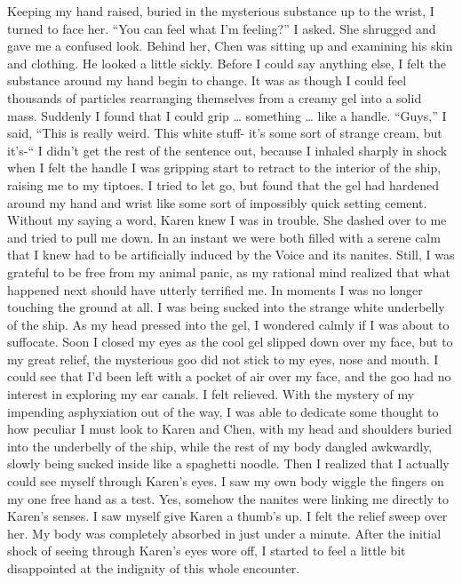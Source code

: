\documentclass[a4paper]{article}
\begin{document}
Keeping my hand raised, buried in the mysterious substance up to the wrist, I turned to face her. “You can feel what I’m feeling?” I asked.
She shrugged and gave me a confused look. Behind her, Chen was sitting up and examining his skin and clothing. He looked a little sickly.
Before I could say anything else, I felt the substance around my hand begin to change. It was as though I could feel thousands of particles rearranging themselves from a creamy gel into a solid mass. Suddenly I found that I could grip … something … like a handle.
“Guys,” I said, “This is really weird. This white stuff- it’s some sort of strange cream, but it’s-“
I didn’t get the rest of the sentence out, because I inhaled sharply in shock when I felt the handle I was gripping start to retract to the interior of the ship, raising me to my tiptoes. I tried to let go, but found that the gel had hardened around my hand and wrist like some sort of impossibly quick setting cement.
Without my saying a word, Karen knew I was in trouble. She dashed over to me and tried to pull me down.
In an instant we were both filled with a serene calm that I knew had to be artificially induced by the Voice and its nanites. Still, I was grateful to be free from my animal panic, as my rational mind realized that what happened next should have utterly terrified me.
In moments I was no longer touching the ground at all. I was being sucked into the strange white underbelly of the ship. As my head pressed into the gel, I wondered calmly if I was about to suffocate.
Soon I closed my eyes as the cool gel slipped down over my face, but to my great relief, the mysterious goo did not stick to my eyes, nose and mouth. I could see that I’d been left with a pocket of air over my face, and the goo had no interest in exploring my ear canals. I felt relieved.
With the mystery of my impending asphyxiation out of the way, I was able to dedicate some thought to how peculiar I must look to Karen and Chen, with my head and shoulders buried into the underbelly of the ship, while the rest of my body dangled awkwardly, slowly being sucked inside like a spaghetti noodle.
Then I realized that I actually could see myself through Karen’s eyes. I saw my own body wiggle the fingers on my one free hand as a test. Yes, somehow the nanites were linking me directly to Karen’s senses. I saw myself give Karen a thumb’s up. I felt the relief sweep over her.
My body was completely absorbed in just under a minute. After the initial shock of seeing through Karen’s eyes wore off, I started to feel a little bit disappointed at the indignity of this whole encounter.
\end{document}
